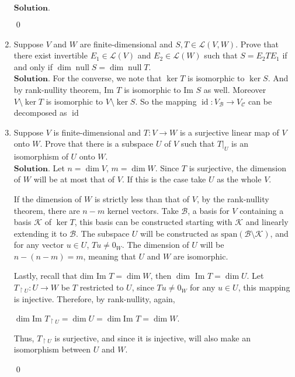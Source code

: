 \documentclass{article}
\theoremstyle{remark}
\begin{document}
\begin{enumerate}
        $\textbf{Solution.}$
        \begin{flushright}
            \qed
        \end{flushright}
        \item Suppose $V$ and $W$ are finite-dimensional and $S, T \in \mathcal{L}(V, W)$. Prove that there exist invertible $E_1 \in \mathcal{L}(V)$ and $E_2 \in \mathcal{L}(W)$ such that $S = E_2 T E_1$ if and only if $\dim \operatorname{null} S = \dim \operatorname{null} T$.\\
        $\textbf{Solution.}$
        For the converse, we note that $\ker T$ is isomorphic to $\ker S$. And by rank-nullity theorem,
        Im $T$ is isomorphic to Im $S$ as well. Moreover $V \setminus \ker T$ is isomorphic to $V \setminus \ker S$.
        So the mapping $\operatorname{id}: V_{\mathcal{B}} \to V_{\mathcal{C}}$ can be decomposed as $\operatorname{id}$

        \item Suppose $V$ is finite-dimensional and $T\colon V \to W$ is a surjective linear map of $V$ onto $W$. Prove that there is a subspace $U$ of $V$ such that $T|_U$ is an isomorphism of $U$ onto $W$.\\
        $\textbf{Solution.}$ Let $n = \dim V$, $m = \dim W$. Since $T$ is surjective, the dimension of $W$ will be at most that of $V$.
        If this is the case take $U$ as the whole $V$. 
        
        If the dimension of $W$ is strictly less than that of $V$, by the rank-nullity theorem,
        there are $n-m$ kernel vectors. Take $\mathcal{B}$, a basis for $V$ containing a basis $\mathcal{K}$ of $\ker T$,
        this basis can be constructed starting with $\mathcal{K}$ and linearly extending it to $\mathcal{B}$.
        The subspace $U$ will be constructed as $\text{span} (\mathcal{B}\setminus \mathcal{K})$,
        and for any vector $u \in U$, $Tu \neq 0_W$.
        The dimension of $U$ will be $n-(n-m) = m$, meaning that $U$ and $W$ are isomorphic.

        Lastly, recall that dim Im $T = \dim W$, then $\dim$ Im $T = \dim U$. Let $T_{\restriction U}: U \to W$
        be $T$ restricted to $U$, since $Tu \neq 0_W$ for any $u \in U$, this mapping is injective. 
        Therefore, by rank-nullity, again, 
        \begin{center}
            $\dim \text{Im } T_{\restriction U} = \dim U = \dim \text{Im } T = \dim W$.
        \end{center}
        Thus, $T_{\restriction U}$ is surjective, and since it is injective,
        will also make an isomorphism between $U$ and $W$.
        \begin{flushright}
            \qed
        \end{flushright}


\end{enumerate}
\end{document}
